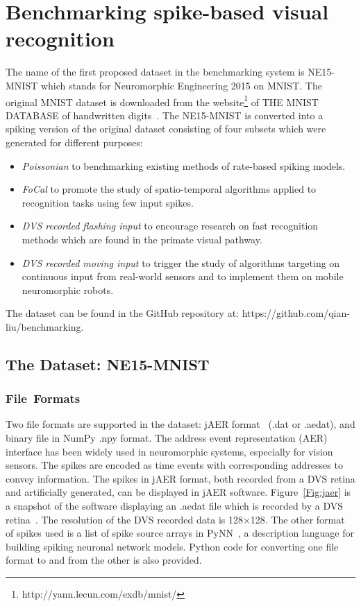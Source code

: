 \documentclass[journal]{journal}
\begin{document}
\section{Benchmarking spike-based visual recognition}
	The name of the first proposed dataset in the benchmarking system is NE15-MNIST which stands for Neuromorphic Engineering 2015 on MNIST.
	The original MNIST dataset is downloaded from the website\footnote{http://yann.lecun.com/exdb/mnist/} of THE MNIST DATABASE of handwritten digits~\cite{lecun1998gradient}.
	The NE15-MNIST is converted into a spiking version of the original dataset consisting of four subsets which were generated for different purposes:
	\begin{itemize}
		\item \textit{Poissonian}
		to benchmarking existing methods of rate-based spiking models.
		\item \textit{FoCal}
		to promote the study of spatio-temporal algorithms applied to recognition tasks using few input spikes.
		\item \textit{DVS recorded flashing input}
		to encourage research on fast recognition methods which are found in the primate visual pathway.
		\item \textit{DVS recorded moving input}
		to trigger the study of algorithms targeting on continuous input from real-world sensors and to implement them on mobile neuromorphic robots.
	\end{itemize}
	The dataset can be found in the GitHub repository at: https://github.com/qian-liu/benchmarking.
	\subsection{The Dataset: NE15-MNIST}
	\subsubsection{File~Formats}
	
	Two file formats are supported in the dataset: jAER format~\cite{delbruck2008frame} (.dat or .aedat), and binary file in NumPy .npy format.
	The  address event representation (AER) interface has been widely used in neuromorphic systems, especially for vision sensors.
	The spikes are encoded as time events with corresponding addresses to convey information.
	The spikes in jAER format, both recorded from a DVS retina and artificially generated, can be displayed in jAER software.
	Figure~\ref{Fig:jaer} is a snapshot of the software displaying an .aedat file which is recorded by a DVS retina~\cite{serrano2013128}.
	The resolution of the DVS recorded data is 128$\times$128.
	The other format of spikes used is a list of spike source arrays in PyNN~\cite{davison2008pynn}, a description language for building spiking neuronal network models.
	Python code for converting one file format to and from the other is also provided.
	
\end{document}
